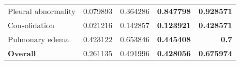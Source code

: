 \documentclass[journal,twoside,web, 11pt]{ieeecolor}
\begin{document}
\begin{table*}[]
\begin{tabular}{lrrrr}
Pleural abnormality         & 0.079893                                                                                        & 0.364286                                                                                        & \textbf{0.847798}                                                                               & \textbf{0.928571}                                                                               \\
Consolidation               & 0.021216                                                                                        & 0.142857                                                                                        & \textbf{0.123921}                                                                               & \textbf{0.428571}                                                                               \\
Pulmonary edema             & 0.423122                                                                                        & 0.653846                                                                                        & \textbf{0.445408}                                                                               & \textbf{0.7}                                                                                    \\ \hline
\textbf{Overall}            & 0.261135                                                                                        & 0.491996                                                                                        & \textbf{0.428056}                                                                               & \textbf{0.675974}                                                                               \\ \hline
\end{tabular}
\end{table*}
\end{document}
